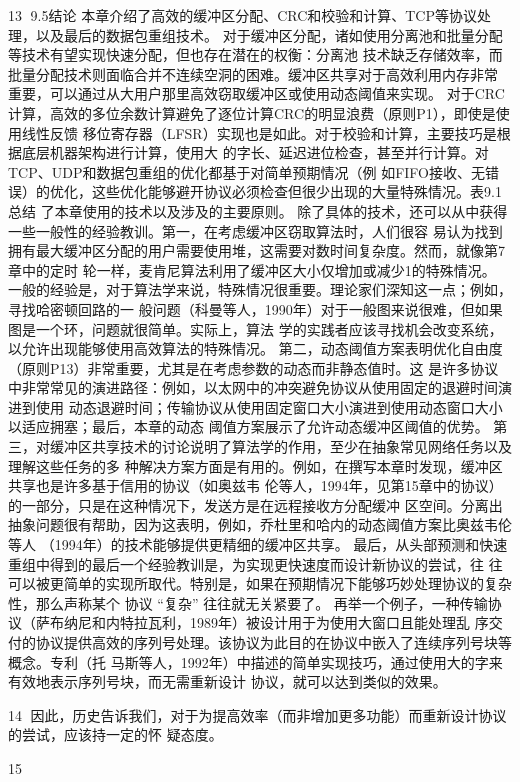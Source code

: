                                                    13
9.5结论
本章介绍了高效的缓冲区分配、CRC和校验和计算、TCP等协议处理，以及最后的数据包重组技术。
对于缓冲区分配，诸如使用分离池和批量分配等技术有望实现快速分配，但也存在潜在的权衡：分离池
技术缺乏存储效率，而批量分配技术则面临合并不连续空洞的困难。缓冲区共享对于高效利用内存非常
重要，可以通过从大用户那里高效窃取缓冲区或使用动态阈值来实现。
对于CRC计算，高效的多位余数计算避免了逐位计算CRC的明显浪费（原则P1），即使是使用线性反馈
移位寄存器（LFSR）实现也是如此。对于校验和计算，主要技巧是根据底层机器架构进行计算，使用大
的字长、延迟进位检查，甚至并行计算。对TCP、UDP和数据包重组的优化都基于对简单预期情况（例
如FIFO接收、无错误）的优化，这些优化能够避开协议必须检查但很少出现的大量特殊情况。表9.1总结
了本章使用的技术以及涉及的主要原则。
除了具体的技术，还可以从中获得一些一般性的经验教训。第一，在考虑缓冲区窃取算法时，人们很容
易认为找到拥有最大缓冲区分配的用户需要使用堆，这需要对数时间复杂度。然而，就像第7章中的定时
轮一样，麦肯尼算法利用了缓冲区大小仅增加或减少1的特殊情况。
一般的经验是，对于算法学来说，特殊情况很重要。理论家们深知这一点；例如，寻找哈密顿回路的一
般问题（科曼等人，1990年）对于一般图来说很难，但如果图是一个环，问题就很简单。实际上，算法
学的实践者应该寻找机会改变系统，以允许出现能够使用高效算法的特殊情况。
第二，动态阈值方案表明优化自由度（原则P13）非常重要，尤其是在考虑参数的动态而非静态值时。这
是许多协议中非常常见的演进路径：例如，以太网中的冲突避免协议从使用固定的退避时间演进到使用
动态退避时间；传输协议从使用固定窗口大小演进到使用动态窗口大小以适应拥塞；最后，本章的动态
阈值方案展示了允许动态缓冲区阈值的优势。
第三，对缓冲区共享技术的讨论说明了算法学的作用，至少在抽象常见网络任务以及理解这些任务的多
种解决方案方面是有用的。例如，在撰写本章时发现，缓冲区共享也是许多基于信用的协议（如奥兹韦
伦等人，1994年，见第15章中的协议）的一部分，只是在这种情况下，发送方是在远程接收方分配缓冲
区空间。分离出抽象问题很有帮助，因为这表明，例如，乔杜里和哈内的动态阈值方案比奥兹韦伦等人
（1994年）的技术能够提供更精细的缓冲区共享。
最后，从头部预测和快速重组中得到的最后一个经验教训是，为实现更快速度而设计新协议的尝试，往
往可以被更简单的实现所取代。特别是，如果在预期情况下能够巧妙处理协议的复杂性，那么声称某个
协议 “复杂” 往往就无关紧要了。
再举一个例子，一种传输协议（萨布纳尼和内特拉瓦利，1989年）被设计用于为使用大窗口且能处理乱
序交付的协议提供高效的序列号处理。该协议为此目的在协议中嵌入了连续序列号块等概念。专利（托
马斯等人，1992年）中描述的简单实现技巧，通过使用大的字来有效地表示序列号块，而无需重新设计
协议，就可以达到类似的效果。

                                                14
因此，历史告诉我们，对于为提高效率（而非增加更多功能）而重新设计协议的尝试，应该持一定的怀
疑态度。




                                            15
